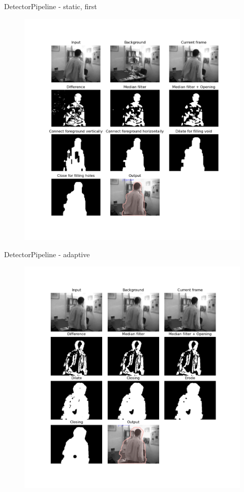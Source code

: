 \documentclass{beamer}
\begin{document}
\begin{frame}{Detector}{Pipeline - static, first}
    \begin{figure}
        \includegraphics[height=0.9\textheight,keepaspectratio]{pipeline_Static_first.png}
    \end{figure}
\end{frame}

\begin{frame}{Detector}{Pipeline - adaptive}
    \begin{figure}
        \includegraphics[height=0.9\textheight,keepaspectratio]{pipeline_adaptive.png}
    \end{figure}
\end{frame}
\end{document}
